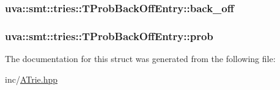 \subsubsection[{back\+\_\+off}]{ uva\+::smt\+::tries\+::\+T\+Prob\+Back\+Off\+Entry\+::back\+\_\+off}\label{structuva_1_1smt_1_1tries_1_1_t_prob_back_off_entry_acd9e9871fbaf91450225855e5c510145}
\hypertarget{structuva_1_1smt_1_1tries_1_1_t_prob_back_off_entry_a214a33956ad703bd35a5aa83f99f7b92}{}
\subsubsection[{prob}]{ uva\+::smt\+::tries\+::\+T\+Prob\+Back\+Off\+Entry\+::prob}\label{structuva_1_1smt_1_1tries_1_1_t_prob_back_off_entry_a214a33956ad703bd35a5aa83f99f7b92}


The documentation for this struct was generated from the following file\+:\begin{DoxyCompactItemize}
\item 
inc/\hyperlink{_a_trie_8hpp}{A\+Trie.\+hpp}\end{DoxyCompactItemize}
